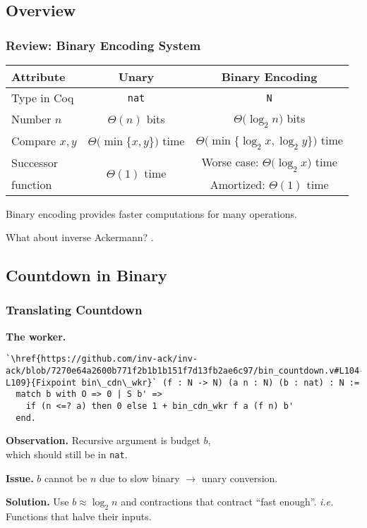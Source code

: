 
\subsection{Overview}

\begin{frame}
\frametitle{Review: Binary Encoding System}

\begin{tabular}{l|c|c}
	Attribute & Unary & Binary Encoding \\ \hline
	Type in Coq & \texttt{nat} & \texttt{N} \topspace{1pt} \\[6pt]
	Number $n$ & $\Theta(n)$ bits & $\Theta\big(\log_2n\big)$ bits \\[7pt]
	Compare $x, y$ & $\Theta\big(\min\{x, y\}\big)$ time & $\Theta\big(\min\{ \log_2x, \log_2y\}\big)$ time \\[9pt]
	Successor & \multirow{2}{*}{$\Theta(1)$ time} & Worse case: $\Theta\big(\log_2x\big)$ time \\[1pt]
	function  &             & Amortized: $\Theta(1)$ time \\
	                    
\end{tabular}

\bigskip

Binary encoding provides faster computations for many operations.

\smallskip

\pause 
What about inverse Ackermann? .

\end{frame}


\subsection{Countdown in Binary}


\begin{frame}[fragile]
\frametitle{Translating Countdown}

\textbf{The worker.}
\begin{lstlisting}
`\href{https://github.com/inv-ack/inv-ack/blob/7270e64a2600b771f2b1b1b151f7d13fb2ae6c97/bin_countdown.v#L104-L109}{Fixpoint bin\_cdn\_wkr}` (f : N -> N) (a n : N) (b : nat) : N :=
  match b with O => 0 | S b' =>
    if (n <=? a) then 0 else 1 + bin_cdn_wkr f a (f n) b'
  end.
\end{lstlisting}

\smallskip

\pause 
\textbf{Observation.} Recursive argument is budget $b$, \\which should still be in \texttt{nat}.

\bigskip

\textbf{Issue.} $b$ cannot be $n$ due to slow binary $\rightarrow$ unary conversion.

\bigskip

\pause 
\textbf{Solution.} Use $b \approx \log_2n$ and contractions that contract ``fast enough''. 
\emph{i.e.} Functions that halve their inputs.
\end{frame}



